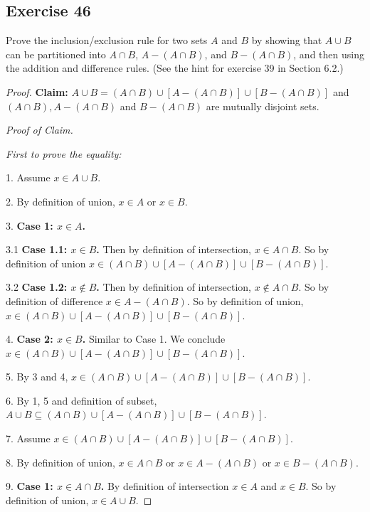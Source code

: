 \documentclass[14pt]{extarticle}
\begin{document}
\subsection{Exercise 46}
Prove the inclusion/exclusion rule for two sets $A$ and $B$ by showing that \(A \cup B\) can be partitioned into
\(A \cap B\), \(A - (A \cap B)\), and \(B - (A \cap B)\), and then using the addition and difference rules.
(See the hint for exercise 39 in Section 6.2.)

\begin{proof}
     {\bf Claim:} \(A \cup B = (A \cap B) \cup [A - (A \cap B)] \cup [B - (A \cap B)]\) and \((A \cap B), A-(A \cap B)\)
     and \(B-(A \cap B)\) are mutually disjoint sets.

          {\it Proof of Claim.}

          {\it First to prove the equality:}

     1. Assume \(x \in A \cup B\).

     2. By definition of union, \(x \in A\) or \(x \in B\).

     3. {\bf Case 1: \(x \in A\).}

     3.1 {\bf Case 1.1: \(x \in B\).} Then by definition of intersection, \(x \in A \cap B\). So by definition of union
     \(x \in (A \cap B) \cup [A - (A \cap B)] \cup [B - (A \cap B)]\).

     3.2 {\bf Case 1.2: \(x \notin B\).} Then by definition of intersection, \(x \notin A \cap B\). So by definition of
     difference \(x \in A - (A \cap B)\). So by definition of union, \(x \in (A \cap B) \cup [A - (A \cap B)] \cup
     [B - (A \cap B)]\).

     4. {\bf Case 2: \(x \in B\).} Similar to Case 1. We conclude \(x \in (A \cap B) \cup [A - (A \cap B)] \cup
     [B - (A \cap B)]\).

     5. By 3 and 4, \(x \in (A \cap B) \cup [A - (A \cap B)] \cup [B - (A \cap B)]\).

     6. By 1, 5 and definition of subset, \(A \cup B \subseteq (A \cap B) \cup [A - (A \cap B)] \cup [B - (A \cap B)]\).

     7. Assume \(x \in (A \cap B) \cup [A - (A \cap B)] \cup
     [B - (A \cap B)]\).

     8. By definition of union, \(x \in A \cap B\) or \(x \in A - (A \cap B)\) or \(x \in B - (A \cap B)\).

     9. {\bf Case 1: \(x \in A \cap B\).} By definition of intersection \(x \in A\) and \(x \in B\). So by definition
     of union, \(x \in A \cup B\).


\end{proof}
\end{document}
